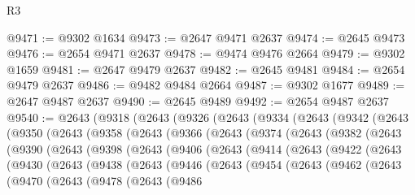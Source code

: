 \begin{lexlean}{R3}
\begin{coremodule}
@9471 := @9302 @1634
@9473 := @2647 @9471 @2637
@9474 := @2645 @9473
@9476 := @2654 @9471 @2637
@9478 := @9474 @9476 @2664
@9479 := @9302 @1659
@9481 := @2647 @9479 @2637
@9482 := @2645 @9481
@9484 := @2654 @9479 @2637
@9486 := @9482 @9484 @2664
@9487 := @9302 @1677
@9489 := @2647 @9487 @2637
@9490 := @2645 @9489
@9492 := @2654 @9487 @2637
@9540 := @2643
    (@9318
      (@2643
        (@9326
          (@2643
            (@9334
              (@2643
                (@9342
                  (@2643
                    (@9350
                      (@2643
                        (@9358
                          (@2643
                            (@9366
                              (@2643
                                (@9374
                                  (@2643
                                    (@9382
                                      (@2643
                                        (@9390
                                          (@2643
                                            (@9398
                                              (@2643
                                                (@9406
                                                  (@2643
                                                    (@9414
                                                      (@2643
                                                        (@9422
                                                          (@2643
                                                            (@9430
                                                              (@2643
                                                                (@9438
                                                                  (@2643
                                                                    (@9446
                                                                      (@2643
                                                                        (@9454
                                                                          (@2643
                                                                            (@9462
                                                                              (@2643
                                                                                (@9470
                                                                                  (@2643
                                                                                    (@9478
                                                                                      (@2643
                                                                                        (@9486

\end{coremodule}
\end{lexlean}
